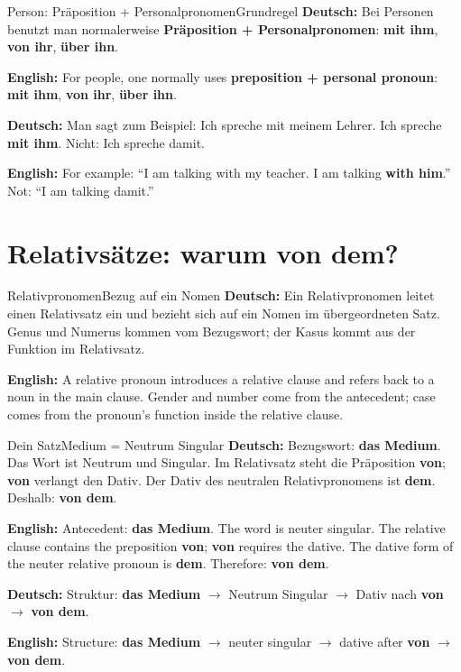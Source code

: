 \documentclass[a4paper,11pt]{article}
\newcommand{\GermanText}[1]{\textbf{Deutsch: }#1\par}
\newcommand{\EnglishText}[1]{{\small\color{SoftGray}\textbf{English: }#1\par}}
\begin{document}
        \begin{grammarentry}{Person: Präposition + Personalpronomen}{Grundregel}
            \GermanText{Bei Personen benutzt man normalerweise \textbf{Präposition + Personalpronomen}: \textbf{mit ihm}, \textbf{von ihr}, \textbf{über ihn}.}
            \EnglishText{For people, one normally uses \textbf{preposition + personal pronoun}: \textbf{mit ihm}, \textbf{von ihr}, \textbf{über ihn}.}

            \GermanText{Man sagt zum Beispiel: \glqq Ich spreche mit meinem Lehrer. Ich spreche \textbf{mit ihm}.\grqq{} Nicht: \glqq Ich spreche damit.\grqq{}}
            \EnglishText{For example: ``I am talking with my teacher. I am talking \textbf{with him}.'' Not: ``I am talking damit.''}
        \end{grammarentry}

    \section{Relativsätze: warum \glqq von dem\grqq?}

        \begin{grammarentry}{Relativpronomen}{Bezug auf ein Nomen}
            \GermanText{Ein Relativpronomen leitet einen Relativsatz ein und bezieht sich auf ein Nomen im übergeordneten Satz. Genus und Numerus kommen vom Bezugswort; der Kasus kommt aus der Funktion im Relativsatz.}
            \EnglishText{A relative pronoun introduces a relative clause and refers back to a noun in the main clause. Gender and number come from the antecedent; case comes from the pronoun's function inside the relative clause.}
        \end{grammarentry}

        \begin{grammarentry}{Dein Satz}{Medium = Neutrum Singular}
            \GermanText{Bezugswort: \textbf{das Medium}. Das Wort ist Neutrum und Singular. Im Relativsatz steht die Präposition \textbf{von}; \textbf{von} verlangt den Dativ. Der Dativ des neutralen Relativpronomens ist \textbf{dem}. Deshalb: \textbf{von dem}.}
            \EnglishText{Antecedent: \textbf{das Medium}. The word is neuter singular. The relative clause contains the preposition \textbf{von}; \textbf{von} requires the dative. The dative form of the neuter relative pronoun is \textbf{dem}. Therefore: \textbf{von dem}.}

            \GermanText{Struktur: \textbf{das Medium} $\rightarrow$ Neutrum Singular $\rightarrow$ Dativ nach \textbf{von} $\rightarrow$ \textbf{von dem}.}
            \EnglishText{Structure: \textbf{das Medium} $\rightarrow$ neuter singular $\rightarrow$ dative after \textbf{von} $\rightarrow$ \textbf{von dem}.}
        \end{grammarentry}
\end{document}
